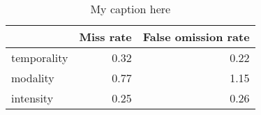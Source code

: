 \begin{table}[!ht]
\centering
\begin{tabular}{lrr}
\toprule
{} &  Miss rate &  False omission rate \\
\midrule
temporality &       0.32 &                 0.22 \\
modality    &       0.77 &                 1.15 \\
intensity   &       0.25 &                 0.26 \\
\bottomrule
\end{tabular}
\caption{My caption here}
\label{tab:MOOD_ASSESMENT-ocd-combined-errors}
\end{table}